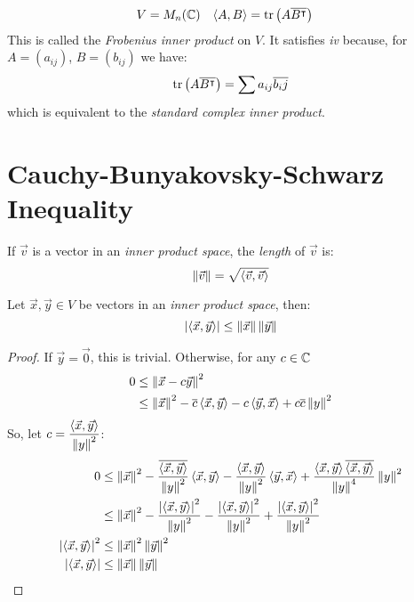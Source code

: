 \begin{defexample}
  \begin{align*}
    V &= M_n(\mathbb{C}) & \left\langle A , B \right\rangle &= \text{tr}\left(A\overline{{B}^{\intercal}}\right)
  \end{align*}
  This is called the \emph{Frobenius inner product} on $V$.
  It satisfies \emph{iv} because, for $A = (a_{ij})$, $B = (b_{ij})$ we have:
    $$\text{tr}\left(A\overline{{B}^{\intercal}}\right) = \sum a_{ij}\overline{b_ij}$$
  which is equivalent to the \emph{standard complex inner product}.
\end{defexample}

\section{Cauchy-Bunyakovsky-Schwarz Inequality}
\begin{definition}[Length]
  If $\vec v$ is a vector in an \emph{inner product space}, the \emph{length} of $\vec v$ is:
    $$\left\lVert\vec v\right\rVert = \sqrt{\left\langle \vec v , \vec v \right\rangle}$$
\end{definition}

\begin{theorem}
  Let $\vec x, \vec y \in V$ be vectors in an \emph{inner product space}, then:
    $$\left|\left\langle \vec x , \vec y \right\rangle\right| \le \left\lVert\vec x\right\rVert\left\lVert\vec y\right\rVert$$
\end{theorem}
\begin{proof}
  If $\vec y = \vec 0$, this is trivial. Otherwise, for any $c \in \mathbb{C}$
  \begin{align}
    0 & \le \left\lVert\vec x - c\vec y\right\rVert^2 \\
      & \le \left\lVert\vec x\right\rVert^2 - \overline{c}\left\langle \vec x , \vec y \right\rangle - c\left\langle \vec y , \vec x \right\rangle + c\overline{c}\left\lVert y\right\rVert^2
  \end{align}
  So, let $c = \dfrac{\left\langle \vec x , \vec y \right\rangle}{\left\lVert y\right\rVert^2}$:
  \begin{align}
    0 & \le \left\lVert\vec x\right\rVert^2
          - \frac{\overline{\left\langle \vec x , \vec y \right\rangle}}{\left\lVert y\right\rVert^2}\left\langle \vec x , \vec y \right\rangle
          - \frac{\left\langle \vec x , \vec y \right\rangle}{\left\lVert y\right\rVert^2}\left\langle \vec y , \vec x \right\rangle
          + \frac{\left\langle \vec x , \vec y \right\rangle\overline{\left\langle \vec x , \vec y \right\rangle}}{\left\lVert y\right\rVert^4}\left\lVert y\right\rVert^2 \\
      & \le \left\lVert\vec x\right\rVert^2
          - \frac{\left|\left\langle \vec x , \vec y \right\rangle\right|^2}{\left\lVert y\right\rVert^2}
          - \frac{\left|\left\langle \vec x , \vec y \right\rangle\right|^2}{\left\lVert y\right\rVert^2}
          + \frac{\left|\left\langle \vec x , \vec y \right\rangle\right|^2}{\left\lVert y\right\rVert^2} \\
    \left|\left\langle \vec x , \vec y \right\rangle\right|^2 & \le \left\lVert\vec x\right\rVert^2 \left\lVert\vec y\right\rVert^2 \\
    \left|\left\langle \vec x , \vec y \right\rangle\right|   & \le \left\lVert\vec x\right\rVert   \left\lVert\vec y\right\rVert
  \end{align}
\end{proof}


